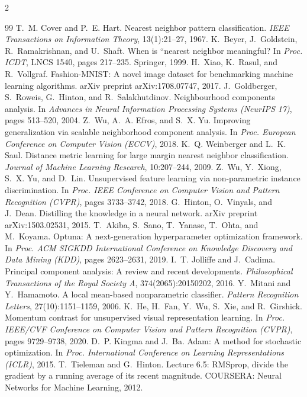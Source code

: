 \documentclass[10pt,a4paper]{article}
\begin{document}
\begin{multicols}{2}
\scriptsize
\begin{thebibliography}{99}
\setlength{\itemsep}{0pt}
 T.~M. Cover and P.~E. Hart. Nearest neighbor pattern classification. \emph{IEEE Transactions on Information Theory}, 13(1):21--27, 1967.
 K.~Beyer, J.~Goldstein, R.~Ramakrishnan, and U.~Shaft. When is ``nearest neighbor meaningful? In \emph{Proc. ICDT}, LNCS 1540, pages 217--235. Springer, 1999.
 H.~Xiao, K.~Rasul, and R.~Vollgraf. Fashion-MNIST: A novel image dataset for benchmarking machine learning algorithms. arXiv preprint arXiv:1708.07747, 2017.
 J.~Goldberger, S.~Roweis, G.~Hinton, and R.~Salakhutdinov. Neighbourhood components analysis. In \emph{Advances in Neural Information Processing Systems (NeurIPS 17)}, pages 513--520, 2004.
 Z.~Wu, A.~A. Efros, and S.~X. Yu. Improving generalization via scalable neighborhood component analysis. In \emph{Proc. European Conference on Computer Vision (ECCV)}, 2018.
 K.~Q. Weinberger and L.~K. Saul. Distance metric learning for large margin nearest neighbor classification. \emph{Journal of Machine Learning Research}, 10:207--244, 2009.
 Z.~Wu, Y.~Xiong, S.~X. Yu, and D.~Lin. Unsupervised feature learning via non-parametric instance discrimination. In \emph{Proc. IEEE Conference on Computer Vision and Pattern Recognition (CVPR)}, pages 3733--3742, 2018.
 G.~Hinton, O.~Vinyals, and J.~Dean. Distilling the knowledge in a neural network. arXiv preprint arXiv:1503.02531, 2015.
 T.~Akiba, S.~Sano, T.~Yanase, T.~Ohta, and M.~Koyama. Optuna: A next-generation hyperparameter optimization framework. In \emph{Proc. ACM SIGKDD International Conference on Knowledge Discovery and Data Mining (KDD)}, pages 2623--2631, 2019.
 I.~T. Jolliffe and J.~Cadima. Principal component analysis: A review and recent developments. \emph{Philosophical Transactions of the Royal Society A}, 374(2065):20150202, 2016.
 Y.~Mitani and Y.~Hamamoto. A local mean-based nonparametric classifier. \emph{Pattern Recognition Letters}, 27(10):1151--1159, 2006.
 K.~He, H.~Fan, Y.~Wu, S.~Xie, and R.~Girshick. Momentum contrast for unsupervised visual representation learning. In \emph{Proc. IEEE/CVF Conference on Computer Vision and Pattern Recognition (CVPR)}, pages 9729--9738, 2020.
 D.~P. Kingma and J.~Ba. Adam: A method for stochastic optimization. In \emph{Proc. International Conference on Learning Representations (ICLR)}, 2015.
 T.~Tieleman and G.~Hinton. Lecture 6.5: RMSprop, divide the gradient by a running average of its recent magnitude. COURSERA: Neural Networks for Machine Learning, 2012.
\end{thebibliography}
\end{multicols}
\end{document}
